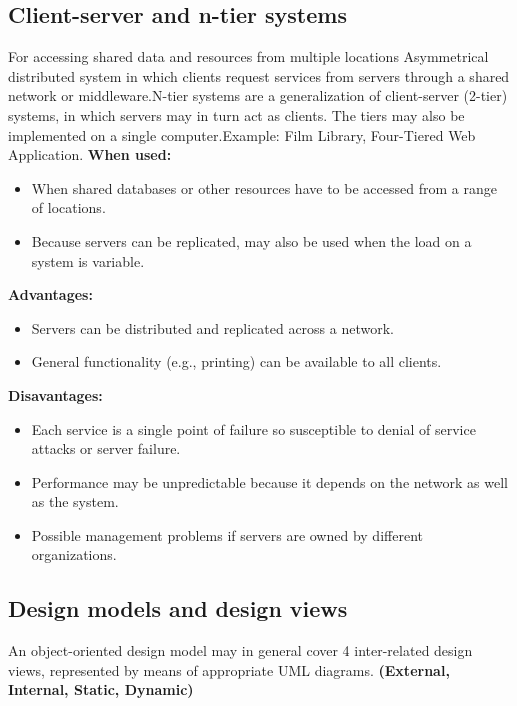 \documentclass[../ESOF_notes.tex]{subfiles}
\begin{document}
    \subsection{Client-server and n-tier systems}
    For accessing shared data and resources from multiple locations \newline \newline
    Asymmetrical distributed system in which clients request services from servers through a shared network or middleware.\newline N-tier systems are a generalization of client-server (2-tier) systems, in which servers may in turn act as clients. The tiers may also be implemented on a single computer.\newline Example: Film Library, Four-Tiered Web Application.\newline\newline
        \textbf{When used:} 
        \begin{itemize}
            \item When shared databases or other resources have to be accessed from a range of locations.
            \item Because servers can be replicated, may also be used when the load on a system is variable.
        \end{itemize}
        \textbf{Advantages:} 
        \begin{itemize}
            \item Servers can be distributed and replicated across a network.
            \item General functionality (e.g., printing) can be available to all clients. 
        \end{itemize}
        \textbf{Disavantages:}
        \begin{itemize}
            \item Each service is a single point of failure so susceptible to denial of service attacks or server failure.
            \item Performance may be unpredictable because it depends on the network as well as the system.
            \item Possible management problems if servers are owned by different organizations.
        \end{itemize}
    
    \subsection{Design models and design views}
    An object-oriented design model may in general cover 4 inter-related design views, represented by means of appropriate UML diagrams. \textbf{(External, Internal, Static, Dynamic)}
    
\end{document}
